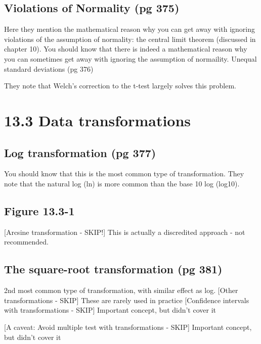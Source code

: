 \documentclass[]{book}
\theoremstyle{definition}
\theoremstyle{definition}
\theoremstyle{definition}
\theoremstyle{remark}
\begin{document}
\subsection{Violations of Normality (pg
375)}\label{violations-of-normality-pg-375}

Here they mention the mathematical reason why you can get away with
ignoring violations of the assumption of normality: the central limit
theorem (discussed in chapter 10). You should know that there is indeed
a mathematical reason why you can sometimes get away with ignoring the
assumption of normaility. Unequal standard deviations (pg 376)

They note that Welch's correction to the t-test largely solves this
problem.

\section{13.3 Data transformations}\label{data-transformations}

\subsection{Log transformation (pg
377)}\label{log-transformation-pg-377}

You should know that this is the most common type of transformation.
They note that the natural log (ln) is more common than the base 10 log
(log10).

\subsection{Figure 13.3-1}\label{figure-13.3-1}

{[}Arcsine transformation - SKIP!{]} This is actually a discredited
approach - not recommended.

\subsection{The square-root transformation (pg
381)}\label{the-square-root-transformation-pg-381}

2nd most common type of transformation, with similar effect as log.
{[}Other transformations - SKIP{]} These are rarely used in practice
{[}Confidence intervals with transformations - SKIP{]} Important
concept, but didn't cover it

{[}A caveat: Avoid multiple test with transformations - SKIP{]}
Important concept, but didn't cover it
\end{document}
